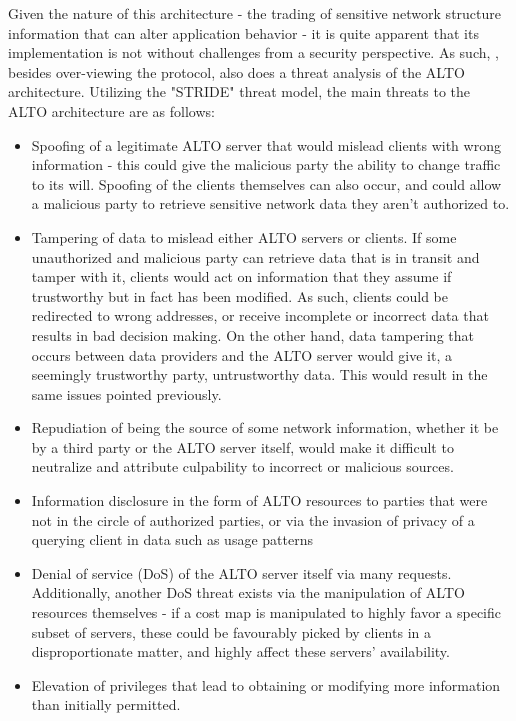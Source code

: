 \documentclass[
  oneside,
  11pt, a4paper,
  footinclude=true,
  headinclude=true,
  cleardoublepage=empty
]{scrbook}
\begin{document}
    Given the nature of this architecture - the trading of sensitive network structure information that can alter application behavior - it is quite apparent that its implementation is not without challenges from a security perspective. As such, \cite{alto-protocol}, besides over-viewing the protocol, also does a threat analysis of the ALTO architecture. Utilizing the "STRIDE" threat model, the main threats to the ALTO architecture are as follows:
    
    \begin{itemize}
        \item Spoofing of a legitimate ALTO server that would mislead clients with wrong information - this could give the malicious party the ability to change traffic to its will. Spoofing of the clients themselves can also occur, and could allow a malicious party to retrieve sensitive network data they aren't authorized to.
        \item Tampering of data to mislead either ALTO servers or clients. If some unauthorized and malicious party can retrieve data that is in transit and tamper with it, clients would act on information that they assume if trustworthy but in fact has been modified. As such, clients could be redirected to wrong addresses, or receive incomplete or incorrect data that results in bad decision making. On the other hand, data tampering that occurs between data providers and the ALTO server would give it, a seemingly trustworthy party, untrustworthy data. This would result in the same issues pointed previously.
        \item Repudiation of being the source of some network information, whether it be by a third party or the ALTO server itself, would make it difficult to neutralize and attribute culpability to incorrect or malicious sources.
        \item Information disclosure in the form of ALTO resources to parties that were not in the circle of authorized parties, or via the invasion of privacy of a querying client in data such as usage patterns
        \item Denial of service (DoS) of the ALTO server itself via many requests. Additionally, another DoS threat exists via the manipulation of ALTO resources themselves - if a cost map is manipulated to highly favor a specific subset of servers, these could be favourably picked by clients in a disproportionate matter, and highly affect these servers' availability.
        \item Elevation of privileges that lead to obtaining or modifying more information than initially permitted.
    \end{itemize}
    
\end{document}
